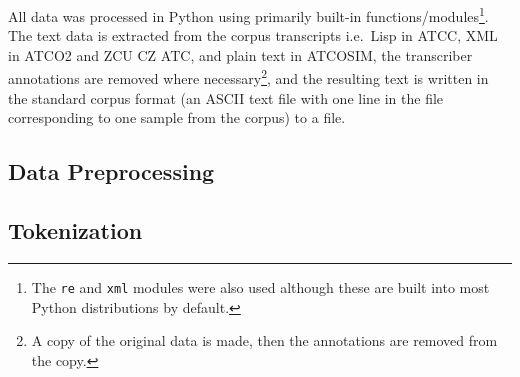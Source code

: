 \documentclass[12pt]{article}
\begin{document}
All data was processed in Python using primarily built-in functions/modules\footnote{The \lstinline|re| and \lstinline|xml| modules were also used although
    these are built into most Python distributions by default.}. The text data is extracted from the corpus transcripts i.e.~Lisp in ATCC, XML in
ATCO2 and ZCU CZ ATC, and plain text in ATCOSIM, the transcriber annotations are removed where necessary\footnote{A copy of the original data is
    made, then the annotations are removed from the copy.}, and the resulting text is written in the standard corpus format (an ASCII text file with
one line in the file corresponding to one sample from the corpus) to a file.

\subsection{Data Preprocessing}


\subsection{Tokenization}

\newpage


\end{document}
